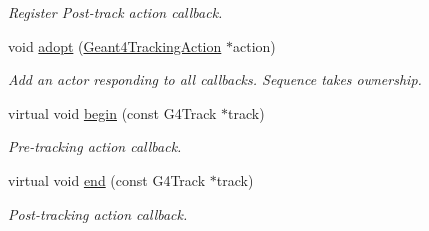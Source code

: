 \begin{DoxyCompactItemize}
\begin{DoxyCompactList}\small\item\em Register Post-\/track action callback. \item\end{DoxyCompactList}\item 
void \hyperlink{class_d_d4hep_1_1_simulation_1_1_geant4_tracking_action_sequence_a6de81eaad737a180e602a8a826bfa06e}{adopt} (\hyperlink{class_d_d4hep_1_1_simulation_1_1_geant4_tracking_action}{Geant4TrackingAction} $\ast$action)
\begin{DoxyCompactList}\small\item\em Add an actor responding to all callbacks. Sequence takes ownership. \item\end{DoxyCompactList}\item 
virtual void \hyperlink{class_d_d4hep_1_1_simulation_1_1_geant4_tracking_action_sequence_a21df8be5f0514bb4295fc2de9afe4eb2}{begin} (const G4Track $\ast$track)
\begin{DoxyCompactList}\small\item\em Pre-\/tracking action callback. \item\end{DoxyCompactList}\item 
virtual void \hyperlink{class_d_d4hep_1_1_simulation_1_1_geant4_tracking_action_sequence_aeed70df4aa406595a03464436c52dce0}{end} (const G4Track $\ast$track)
\begin{DoxyCompactList}\small\item\em Post-\/tracking action callback. \item\end{DoxyCompactList}\end{DoxyCompactItemize}
